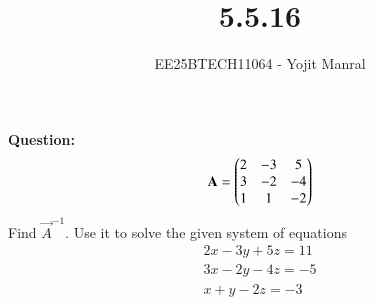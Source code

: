 \documentclass[journal]{IEEEtran}
\begin{document}

\vspace{3cm}

\title{5.5.16}
\author{EE25BTECH11064 - Yojit Manral}

\maketitle
{\let\newpage\relax\maketitle}
\renewcommand{\thefigure}{\theenumi}
\renewcommand{\thetable}{\theenumi}
\setlength{\intextsep}{10pt} %

\textbf{Question:}\\
\begin{align}
    \mathbf{A} = \begin{pmatrix}2&-3&5\\3&-2&-4\\1&1&-2\end{pmatrix}
\end{align}
Find $\vec{A}^{-1}$. Use it to solve the given system of equations
\begin{align}
2x - 3y + 5z = 11 \\
3x - 2y - 4z = -5 \\
x + y - 2z = -3
\end{align}
\end{document}
